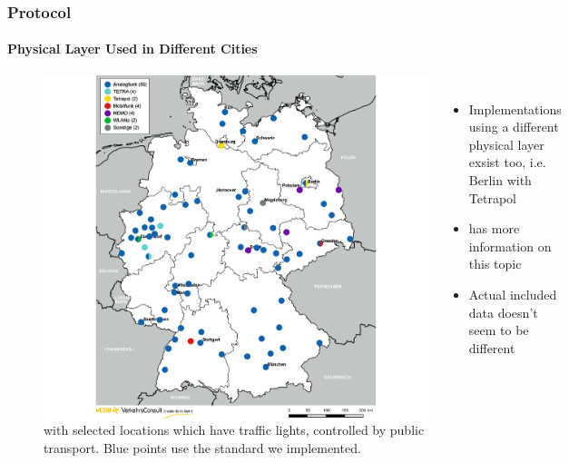 
\begin{frame}
\frametitle{Protocol}
\framesubtitle{Physical Layer Used in Different Cities}
\begin{figure}
\begin{columns}
\centering
\includegraphics[height=0.8\textheight]{figs/vcdb-map-ampelbeeinflussung.png}
\caption{ with selected locations which have traffic lights, controlled by public transport. Blue points use the standard we implemented.}
\begin{itemize}
	\item Implementations using a different physical layer exsist too, i.e. Berlin with Tetrapol
	\item {} has more information on this topic
	\item Actual included data doesn't seem to be different
\end{itemize}
\end{columns}
\end{figure}
\end{frame}

